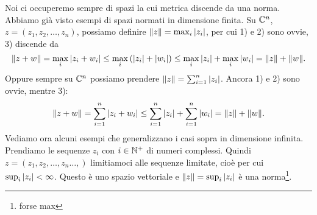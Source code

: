 Noi ci occuperemo sempre di spazi la cui metrica discende da una norma.
Abbiamo già visto esempi di spazi normati in dimensione finita. Su $\mathbb C^n$,
$z = \left( z_1, z_2, \ldots, z_n \right)$, possiamo definire
$\|z\| = \max_i {\left|z_i\right|}$, per cui 1) e 2) sono ovvie, 3) discende da \[
\|z + w\| = \max_i {\left|z_i + w_i\right|} \leq \max_i \left({\left|z_i\right|} + {\left|w_i\right|}\right)
\leq \max_i {\left|z_i\right|} + \max_i {\left|w_i\right|} = \|z\| + \|w\|
.\] 
Oppure sempre su $\mathbb C^n$ possiamo prendere $\|z\| = \sum_{i=1}^{n} {\left|z_i\right|}$.
Ancora 1) e 2) sono ovvie, mentre 3):
\[
	\|z + w\| = \sum_{i=1}^{n} {\left|z_i + w_i\right|} \leq \sum_{i=1}^{n} {\left|z_i\right|} +
	\sum_{i=1}^{n} {\left|w_i\right|} = \|z\| + \|w\|
.\] 
Vediamo ora alcuni esempi che generalizzano i casi sopra in dimensione
infinita. Prendiamo le sequenze $z_i$ con $i \in \mathbb N^+$ di numeri complessi.
Quindi $z = \left( z_1, z_2, \ldots, z_n \ldots,  \right)$ limitiamoci alle
sequenze limitate, cioè per cui $\sup_i {\left|z_i\right|} < \infty$. Questo è uno
spazio vettoriale e $\|z\| = \sup_i {\left|z_i\right|}$ è una norma\footnote{forse max}.
